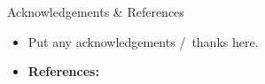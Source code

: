 \documentclass[final,hyperref={pdfpagelabels=false}]{beamer}
\begin{document}
\begin{frame}[t]
\begin{columns}[t]
\begin{column}{.49\textwidth}
    \vspace{-1.05cm}

    \begin{block}{Acknowledgements \& References}
    \begin{itemize}
    \item 
    \small
      Put any acknowledgements \slash\ thanks here.\\[5mm]
    
      \normalsize
      \item
      \small 
      \linespread{0.895}
      \textbf{References:}\selectfont
      \scriptsize{
      }
    \end{itemize}
    \end{block}

  \end{column} %

  \begin{column}{.01\textwidth}\end{column} %

\end{columns} %

\end{frame} %
\end{document}
